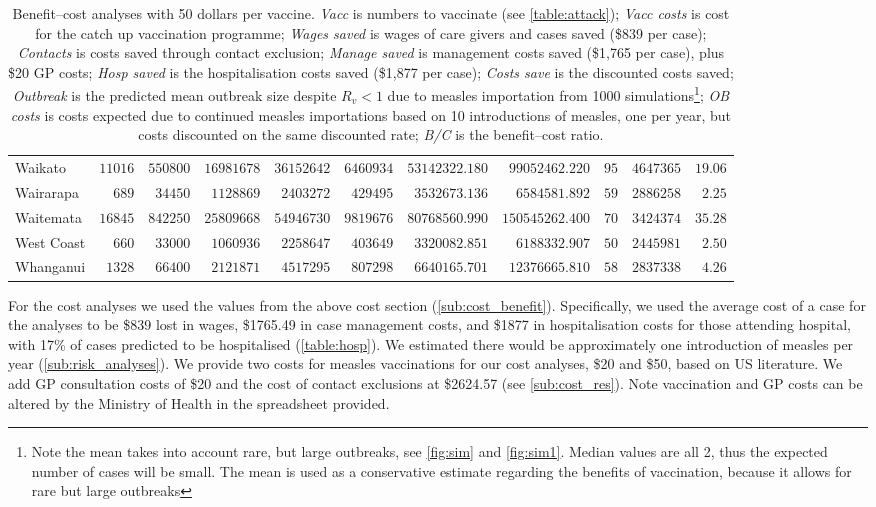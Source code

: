 \documentclass{article}
\begin{document}
\begin{table}
\begin{center}
\begin{tabular}{lrrrrrrrrrr}
Waikato&$11016$&$550800$&$16981678$&$36152642$&$ 6460934$&$53142322.180$&$ 99052462.220$&$ 95$&$4647365$&$19.06$\tabularnewline
Wairarapa&$  689$&$ 34450$&$ 1128869$&$ 2403272$&$  429495$&$ 3532673.136$&$  6584581.892$&$ 59$&$2886258$&$ 2.25$\tabularnewline
Waitemata&$16845$&$842250$&$25809668$&$54946730$&$ 9819676$&$80768560.990$&$150545262.400$&$ 70$&$3424374$&$35.28$\tabularnewline
West Coast&$  660$&$ 33000$&$ 1060936$&$ 2258647$&$  403649$&$ 3320082.851$&$  6188332.907$&$ 50$&$2445981$&$ 2.50$\tabularnewline
Whanganui&$ 1328$&$ 66400$&$ 2121871$&$ 4517295$&$  807298$&$ 6640165.701$&$ 12376665.810$&$ 58$&$2837338$&$ 4.26$\tabularnewline
\hline
\end{tabular}\end{center}\caption{Benefit--cost analyses with 50 dollars per vaccine. \textit{Vacc} is numbers to vaccinate (see \autoref{table:attack}); \textit{Vacc costs} is cost for the catch up vaccination programme; \textit{Wages saved} is wages of care givers and cases saved (\$839 per case); \textit{Contacts} is costs saved through contact exclusion; \textit{Manage saved} is management costs saved (\$1,765 per case), plus \$20 GP costs; \textit{Hosp saved} is the hospitalisation costs saved (\$1,877 per case); \textit{Costs save}  is the discounted costs saved; \textit{Outbreak}  is the predicted mean outbreak size despite $R_v < 1$ due to measles importation from 1000 simulations\footnote{Note the mean takes into account rare, but large outbreaks, see \autoref{fig:sim} and \autoref{fig:sim1}. Median values are all 2, thus the expected number of cases will be small. The mean is used as a conservative estimate regarding the benefits of vaccination, because it allows for rare but large outbreaks}; \textit{OB costs}	is costs expected due to continued measles importations based on 10 introductions of measles, one per year, but costs discounted on the same discounted rate; \textit{B/C} is the benefit--cost ratio.}
\label{table:cost50}
\end{table}

For the cost analyses we used the values from the above cost section (\autoref{sub:cost_benefit}). Specifically, we used the average cost of a case for the analyses to be \$839 lost in wages, \$1765.49 in case management costs, and \$1877 in hospitalisation costs for those attending hospital, with 17\% of cases predicted to be hospitalised (\autoref{table:hosp}). We estimated there would be approximately one introduction of measles per year (\autoref{sub:risk_analyses}). We provide two costs for measles vaccinations for our cost analyses, \$20 and \$50, based on US literature. We add GP consultation costs of \$20 and the cost of contact exclusions at \$2624.57 (see \autoref{sub:cost_res}). Note vaccination and GP costs can be altered by the Ministry of Health in the spreadsheet provided.
\end{document}

